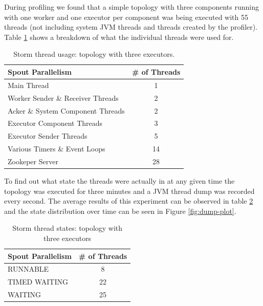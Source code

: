 \documentclass[bsc,twoside,singlespacing,normalheadings,parskip]{infthesis}\usepackage[]{graphicx}\usepackage[]{color}
\begin{document}
During profiling we found that a simple topology with three components running with one worker and one executor per component was being executed with 55 threads (not including system JVM threads and threads created by the profiler). Table \ref{table:breakdown} shows a breakdown of what the individual threads were used for.

\begin{table}[htb!]
\centering
\small
\begin{tabular}{@{}lc@{}}
    \textbf{Spout Parallelism} & \textbf{\# of Threads} \\ \toprule
    Main Thread & 1  \\
	Worker Sender \& Receiver Threads & 2  \\
    Acker \& System Component Threads & 2  \\
    Executor Component Threads & 3  \\
    Executor Sender Threads & 5  \\
    Various Timers \& Event Loops & 14  \\
    Zookeper Server & 28  \\
\end{tabular}
\caption[Storm thread usage]{Storm thread usage: topology with three executors.}
\label{table:breakdown}
\end{table}

To find out what state the threads were actually in at any given time the topology was executed for three minutes and a JVM thread dump was recorded every second. The average results of this experiment can be observed in table \ref{table:dump} and the state distribution over time can be seen in Figure \ref{fig:dump-plot}.

\begin{table}[htb!]
\centering
\small
\begin{tabular}{@{}lc@{}}
    \textbf{Spout Parallelism} & \textbf{\# of Threads} \\ \toprule
    RUNNABLE & 8  \\
	TIMED WAITING & 22  \\
    WAITING & 25  \\
\end{tabular}
\caption[Storm thread states]{Storm thread states: topology with three executors}
\label{table:dump}
\end{table}
\end{document}
